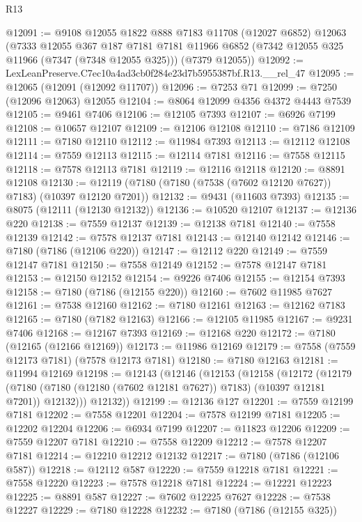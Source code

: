 \begin{lexlean}{R13}
\begin{coremodule}
@12091 := @9108
    @12055
    @1822
    @888
    @7183
    @11708
    (@12027 @6852)
    @12063
    (@7333
      @12055
      @367
      @187
      @7181
      @7181
      @11966
      @6852
      (@7342 @12055 @325 @11966 (@7347 (@7348 @12055 @325)))
      (@7379 @12055))
@12092 := LexLeanPreserve.C7ec10a4ad3cb0f284e23d7b5955387bf.R13.__rel_47
@12095 := @12065 (@12091 (@12092 @11707))
@12096 := @7253 @71
@12099 := @7250 (@12096 @12063) @12055
@12104 := @8064 @12099 @4356 @4372 @4443 @7539
@12105 := @9461 @7406
@12106 := @12105 @7393
@12107 := @6926 @7199
@12108 := @10657 @12107
@12109 := @12106 @12108
@12110 := @7186 @12109
@12111 := @7180 @12110
@12112 := @11984 @7393
@12113 := @12112 @12108
@12114 := @7559 @12113
@12115 := @12114 @7181
@12116 := @7558 @12115
@12118 := @7578 @12113 @7181
@12119 := @12116 @12118
@12120 := @8891 @12108
@12130 := @12119 (@7180 (@7180 (@7538 (@7602 @12120 @7627)) @7183) (@10397 @12120 @7201))
@12132 := @9431 (@11603 @7393)
@12135 := @8075 (@12111 (@12130 @12132))
@12136 := @10520 @12107
@12137 := @12136 @220
@12138 := @7559 @12137
@12139 := @12138 @7181
@12140 := @7558 @12139
@12142 := @7578 @12137 @7181
@12143 := @12140 @12142
@12146 := @7180 (@7186 (@12106 @220))
@12147 := @12112 @220
@12149 := @7559 @12147 @7181
@12150 := @7558 @12149
@12152 := @7578 @12147 @7181
@12153 := @12150 @12152
@12154 := @9226 @7406
@12155 := @12154 @7393
@12158 := @7180 (@7186 (@12155 @220))
@12160 := @7602 @11985 @7627
@12161 := @7538 @12160
@12162 := @7180 @12161
@12163 := @12162 @7183
@12165 := @7180 (@7182 @12163)
@12166 := @12105 @11985
@12167 := @9231 @7406
@12168 := @12167 @7393
@12169 := @12168 @220
@12172 := @7180 (@12165 (@12166 @12169))
@12173 := @11986 @12169
@12179 := @7558 (@7559 @12173 @7181) (@7578 @12173 @7181)
@12180 := @7180 @12163
@12181 := @11994 @12169
@12198 := @12143
    (@12146
      (@12153
        (@12158
          (@12172
            (@12179
              (@7180 (@7180 (@12180 (@7602 @12181 @7627)) @7183) (@10397 @12181 @7201))
              @12132)))
        @12132))
@12199 := @12136 @127
@12201 := @7559 @12199 @7181
@12202 := @7558 @12201
@12204 := @7578 @12199 @7181
@12205 := @12202 @12204
@12206 := @6934 @7199
@12207 := @11823 @12206
@12209 := @7559 @12207 @7181
@12210 := @7558 @12209
@12212 := @7578 @12207 @7181
@12214 := @12210 @12212 @12132
@12217 := @7180 (@7186 (@12106 @587))
@12218 := @12112 @587
@12220 := @7559 @12218 @7181
@12221 := @7558 @12220
@12223 := @7578 @12218 @7181
@12224 := @12221 @12223
@12225 := @8891 @587
@12227 := @7602 @12225 @7627
@12228 := @7538 @12227
@12229 := @7180 @12228
@12232 := @7180 (@7186 (@12155 @325))

\end{coremodule}
\end{lexlean}
